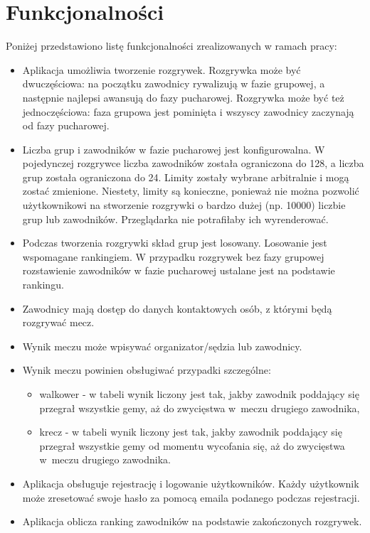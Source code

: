 \documentclass[shortabstract]{iithesis}
\begin{document}
\section{Funkcjonalności}
\noindent
Poniżej przedstawiono listę funkcjonalności zrealizowanych w ramach pracy:
\begin{itemize}
    \item Aplikacja umożliwia tworzenie rozgrywek. Rozgrywka może być dwuczęściowa: na początku zawodnicy rywalizują w fazie grupowej, a następnie najlepsi awansują do fazy pucharowej.
          Rozgrywka może być też jednoczęściowa: faza grupowa jest pominięta i wszyscy zawodnicy zaczynają od fazy pucharowej.
    \item Liczba grup i zawodników w fazie pucharowej jest konfigurowalna.
          W pojedynczej rozgrywce liczba zawodników została ograniczona do 128, a liczba grup została ograniczona do 24.
          Limity zostały wybrane arbitralnie i mogą zostać zmienione.
          Niestety, limity są konieczne, ponieważ nie można pozwolić użytkownikowi na stworzenie rozgrywki o bardzo dużej (np. 10000) liczbie grup lub zawodników.
          Przeglądarka nie potrafiłaby ich wyrenderować.
    \item Podczas tworzenia rozgrywki skład grup jest losowany. Losowanie jest wspomagane rankingiem.
          W przypadku rozgrywek bez fazy grupowej rozstawienie zawodników w fazie pucharowej ustalane jest na podstawie rankingu.
    \item Zawodnicy mają dostęp do danych kontaktowych osób, z którymi będą rozgrywać mecz.
    \item Wynik meczu może wpisywać organizator/sędzia lub zawodnicy.
    \item Wynik meczu powinien obsługiwać przypadki szczególne:
          \begin{itemize}
              \item walkower - w tabeli wynik liczony jest tak, jakby zawodnik poddający się przegrał wszystkie gemy, aż do zwycięstwa w~meczu drugiego zawodnika,
              \item krecz - w tabeli wynik liczony jest tak, jakby zawodnik poddający się przegrał wszystkie gemy od momentu wycofania się, aż do zwycięstwa w~meczu drugiego zawodnika.
          \end{itemize}
    \item Aplikacja obsługuje rejestrację i logowanie użytkowników. Każdy użytkownik może zresetować swoje hasło za pomocą emaila podanego podczas rejestracji.
    \item Aplikacja oblicza ranking zawodników na podstawie zakończonych rozgrywek.
\end{itemize}
\end{document}

